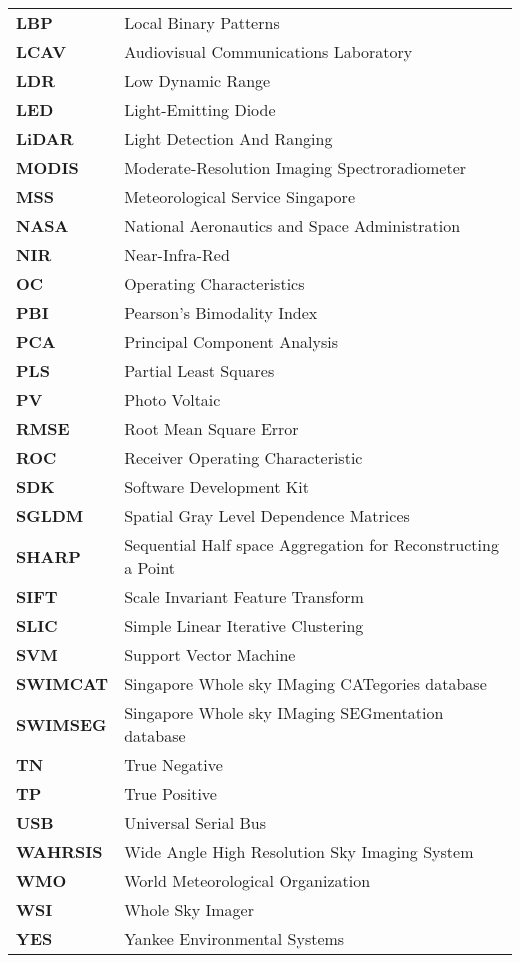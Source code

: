 \begin{longtable}[l]{p{100pt}p{400pt}}
\textbf{LBP} & Local Binary Patterns \\
\textbf{LCAV} & Audiovisual Communications Laboratory \\
\textbf{LDR} & Low Dynamic Range \\
\textbf{LED} & Light-Emitting Diode \\
\textbf{LiDAR} & Light Detection And Ranging \\
\textbf{MODIS} & Moderate-Resolution Imaging Spectroradiometer \\
\textbf{MSS} & Meteorological Service Singapore \\
\textbf{NASA} & National Aeronautics and Space Administration \\
\textbf{NIR} & Near-Infra-Red \\
\textbf{OC} & Operating Characteristics \\
\textbf{PBI} & Pearson's Bimodality Index \\
\textbf{PCA} & Principal Component Analysis \\
\textbf{PLS} & Partial Least Squares \\
\textbf{PV} & Photo Voltaic \\
\textbf{RMSE} & Root Mean Square Error \\
\textbf{ROC} & Receiver Operating Characteristic \\
\textbf{SDK} & Software Development Kit \\
\textbf{SGLDM} & Spatial Gray Level Dependence Matrices \\
\textbf{SHARP} & Sequential Half space Aggregation for Reconstructing a Point \\
\textbf{SIFT} & Scale Invariant Feature Transform \\
\textbf{SLIC} & Simple Linear Iterative Clustering \\
\textbf{SVM} & Support Vector Machine \\
\textbf{SWIMCAT} & Singapore Whole sky IMaging CATegories database \\
\textbf{SWIMSEG} & Singapore Whole sky IMaging SEGmentation database \\
\textbf{TN} & True Negative \\
\textbf{TP} & True Positive \\
\textbf{USB} & Universal Serial Bus \\
\textbf{WAHRSIS} & Wide Angle High Resolution Sky Imaging System \\
\textbf{WMO} & World Meteorological Organization \\
\textbf{WSI} & Whole Sky Imager \\
\textbf{YES} & Yankee Environmental Systems\\
\end{longtable}

